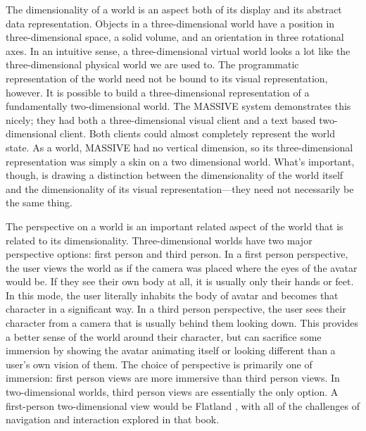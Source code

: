 The dimensionality of a world is an aspect both of its display and its abstract data representation. Objects in a three-dimensional world have a position in three-dimensional space, a solid volume, and an orientation in three rotational axes. In an intuitive sense, a three-dimensional virtual world looks a lot like the three-dimensional physical world we are used to. The programmatic representation of the world need not be bound to its visual representation, however. It is possible to build a three-dimensional representation of a fundamentally two-dimensional world. The MASSIVE system demonstrates this nicely; they had both a three-dimensional visual client and a text based two-dimensional client. Both clients could almost completely represent the world state. As a world, MASSIVE had no vertical dimension, so its three-dimensional representation was simply a skin on a two dimensional world. \citep{Greenhalgh:1995gz} What’s important, though, is drawing a distinction between the dimensionality of the world itself and the dimensionality of its visual representation—they need not necessarily be the same thing.

The perspective on a world is an important related aspect of the world that is related to its dimensionality. Three-dimensional worlds have two major perspective options: first person and third person. In a first person perspective, the user views the world as if the camera was placed where the eyes of the avatar would be. If they see their own body at all, it is usually only their hands or feet. In this mode, the user literally inhabits the body of avatar and becomes that character in a significant way. In a third person perspective, the user sees their character from a camera that is usually behind them looking down. This provides a better sense of the world around their character, but can sacrifice some immersion by showing the avatar animating itself or looking different than a user’s own vision of them. The choice of perspective is primarily one of immersion: first person views are more immersive than third person views. In two-dimensional worlds, third person views are essentially the only option. A first-person two-dimensional view would be Flatland \citep{Abbot:1899th}, with all of the challenges of navigation and interaction explored in that book.

